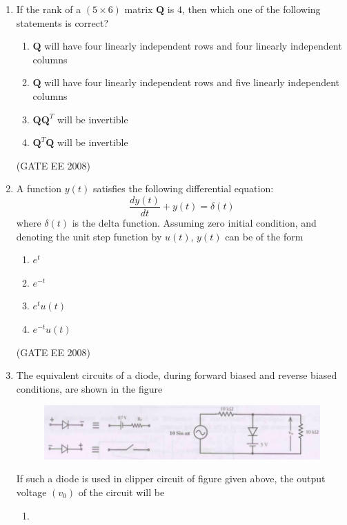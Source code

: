 \documentclass[journal,12pt,onecolumn]{IEEEtran}
\theoremstyle{remark}
\begin{document}
\begin{enumerate}[start=1, label=Q.\arabic*]
\item If the rank of a $(5 \times 6)$ matrix $\mathbf{Q}$ is $4$, then which one of the following statements is correct?

\begin{enumerate}[label=(\Alph*)]
    \item $\mathbf{Q}$ will have four linearly independent rows and four linearly independent columns
    \item $\mathbf{Q}$ will have four linearly independent rows and five linearly independent columns
    \item $\mathbf{Q} \mathbf{Q}^T$ will be invertible
    \item $\mathbf{Q}^T \mathbf{Q}$ will be invertible
\end{enumerate}
\hfill (GATE EE 2008)




\item A function $y(t)$ satisfies the following differential equation:
\[
\frac{dy(t)}{dt} + y(t) = \delta(t)
\]
where $\delta(t)$ is the delta function. Assuming zero initial condition, and denoting the unit step function by $u(t)$, $y(t)$ can be of the form

\begin{enumerate}[label=(\Alph*)]
    \item $e^{t}$
    \item $e^{-t}$
    \item $e^{t}u(t)$
    \item $e^{-t}u(t)$
\end{enumerate}
\hfill (GATE EE 2008)





\item The equivalent circuits of a diode, during forward biased and reverse biased
conditions, are shown in the figure
\begin{figure}[H]
    \includegraphics[width=\columnwidth]{Fig/q8.png}
    \label{fig:placeholder}
\end{figure}
If such a diode is used in clipper circuit of figure given above, the output voltage $(v_0)$ of the circuit will be
\begin{enumerate}[label=(\Alph*)]
\item 
\begin{figure}[H]
    

\end{figure}
\end{enumerate}
\end{enumerate}
\end{document}
